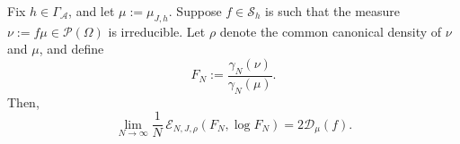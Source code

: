 \documentclass[10pt,a4paper]{amsart}
\let\G=\Gamma
\let\r=\rho \let\s=\sigma \let\t=\tau
\let\t=\tau
\newcommand{\cA}{\ensuremath{\mathcal A}}
\newcommand{\cS}{\ensuremath{\mathcal S}}
\begin{document}
\begin{proposition}\label{Fisher Chaos}
    Fix $h\in\G_\cA$, and let $\mu:=\mu_{J,h}$. Suppose  $f\in\cS_h$ is such that the  measure \(\nu := f \mu \in \mathcal{P}(\Omega)\) is irreducible. 
        Let $\r$ denote the common canonical density of $\nu$ and $\mu$, and define
    \begin{equation}\label{observable approximat}
        F_N := \frac{\gamma_N(\nu)}{\gamma_N(\mu)}.
    \end{equation}
    Then,
    \begin{equation}\label{observable approximat2}
    \lim_{N \to \infty} \frac{1}{N}\, \mathcal{E}_{N, J,\r}(F_N, \log F_N) = 2\mathcal{D}_\mu(f).
    \end{equation}
\end{proposition}
\end{document}
